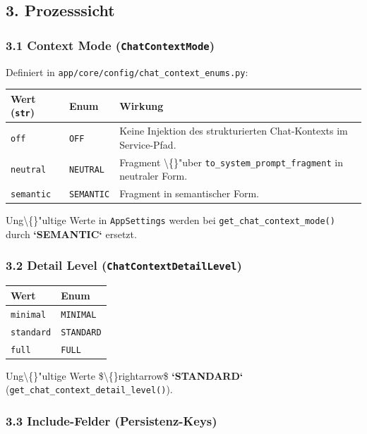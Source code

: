 \subsection{3. Prozesssicht}

\subsubsection{3.1 Context Mode (\texttt{ChatContextMode})}

Definiert in \texttt{app/core/config/chat\_context\_enums.py}:

\begin{center}
\begin{tabular}{lll}
\hline
Wert (\texttt{str}) & Enum & Wirkung \\
\hline
\texttt{off} & \texttt{OFF} & Keine Injektion des strukturierten Chat-Kontexts im Service-Pfad. \\
\texttt{neutral} & \texttt{NEUTRAL} & Fragment \textbackslash\{\}"uber \texttt{to\_system\_prompt\_fragment} in neutraler Form. \\
\texttt{semantic} & \texttt{SEMANTIC} & Fragment in semantischer Form. \\
\hline
\end{tabular}
\end{center}

Ung\textbackslash\{\}"ultige Werte in \texttt{AppSettings} werden bei \texttt{get\_chat\_context\_mode()} durch \textbf{`SEMANTIC`} ersetzt.

\subsubsection{3.2 Detail Level (\texttt{ChatContextDetailLevel})}

\begin{center}
\begin{tabular}{ll}
\hline
Wert & Enum \\
\hline
\texttt{minimal} & \texttt{MINIMAL} \\
\texttt{standard} & \texttt{STANDARD} \\
\texttt{full} & \texttt{FULL} \\
\hline
\end{tabular}
\end{center}

Ung\textbackslash\{\}"ultige Werte \$\textbackslash\{\}rightarrow\$ \textbf{`STANDARD`} (\texttt{get\_chat\_context\_detail\_level()}).

\subsubsection{3.3 Include-Felder (Persistenz-Keys)}

